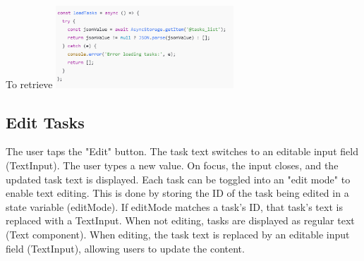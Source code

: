 \documentclass[a4paper,12pt]{article}
\begin{document}
 To retrieve
\includegraphics[width=0.5\textwidth]{per 3.png}
 



\subsection{Edit Tasks }
The user taps the "Edit" button.
The task text switches to an editable input field (TextInput).
The user types a new value.
On focus, the input closes, and the updated task text is displayed.
Each task can be toggled into an "edit mode" to enable text editing. This is done by storing the ID of the task being edited in a state variable (editMode). If editMode matches a task's ID, that task's text is replaced with a TextInput.
When not editing, tasks are displayed as regular text (Text component).
When editing, the task text is replaced by an editable input field (TextInput), allowing users to update the content.
\end{document}
